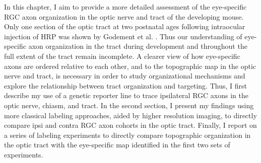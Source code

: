 In this chapter, I aim to provide a more detailed assessment of the eye-specific RGC axon organization in the optic nerve and tract of the developing mouse.
Only one section of the optic tract at two postnatal ages following intraocular injection of HRP was shown by Godement et al. .
Thus our understanding of eye-specific axon organization in the tract during development and throughout the full extent of the tract remain incomplete.
A clearer view of how eye-specific axons are ordered relative to each other, and to the topographic map in the optic nerve and tract, is necessary in order to study organizational mechanisms and explore the relationship between tract organization and targeting.
Thus, I first describe my use of a genetic reporter line to trace ipsilateral RGC axons in the optic nerve, chiasm, and tract.
In the second section, I present my findings using more classical labeling approaches, aided by higher resolution imaging, to directly compare ipsi and contra RGC axon cohorts in the optic tract.
Finally, I report on a series of labeling experiments to directly compare topographic organization in the optic tract with the eye-specific map identified in the first two sets of experiments.